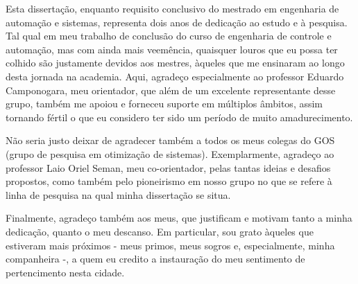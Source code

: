 


\begin{agradecimentos}[Agradecimentos]

Esta dissertação, enquanto requisito conclusivo do mestrado em engenharia de automação e sistemas, representa dois anos de dedicação ao estudo e à pesquisa.
Tal qual em meu trabalho de conclusão do curso de engenharia de controle e automação, mas com ainda mais veemência, quaisquer louros que eu possa ter colhido são justamente devidos aos mestres, àqueles que me ensinaram ao longo desta jornada na academia.
Aqui, agradeço especialmente ao professor Eduardo Camponogara, meu orientador, que além de um excelente representante desse grupo, também me apoiou e forneceu suporte em múltiplos âmbitos, assim tornando fértil o que eu considero ter sido um período de muito amadurecimento.

Não seria justo deixar de agradecer também a todos os meus colegas do GOS (grupo de pesquisa em otimização de sistemas).
Exemplarmente, agradeço ao professor Laio Oriel Seman, meu co-orientador, pelas tantas ideias e desafios propostos, como também pelo pioneirismo em nosso grupo no que se refere à linha de pesquisa na qual minha dissertação se situa.

Finalmente, agradeço também aos meus, que justificam e motivam tanto a minha dedicação, quanto o meu descanso.
Em particular, sou grato àqueles que estiveram mais próximos - meus primos, meus sogros e, especialmente, minha companheira -, a quem eu credito a instauração do meu sentimento de pertencimento nesta cidade.

\end{agradecimentos}


%
%
%
